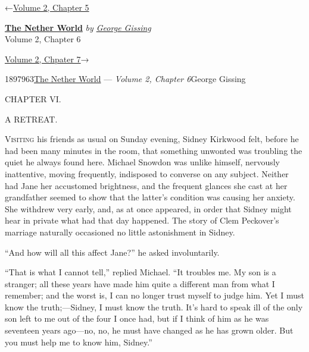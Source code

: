 \hypertarget{headerContainer}{}
\hypertarget{navigationHeader}{}
\protect\hypertarget{headerprevious}{}{←\href{/wiki/The_Nether_World/Volume_2/Chapter_5}{Volume
2, Chapter 5}}

\textbf{\protect\hypertarget{header_title_text}{}{\href{/wiki/The_Nether_World}{The
Nether World}}} \emph{by
\href{/wiki/Author:George_Gissing}{\protect\hypertarget{header_author_text}{}{{George
Gissing}}}}\\
\protect\hypertarget{header_section_text}{}{Volume 2, Chapter 6}

\protect\hypertarget{headernext}{}{\href{/wiki/The_Nether_World/Volume_2/Chapter_7}{Volume
2, Chpater 7}→}

\hypertarget{navigationNotes}{}

\hypertarget{ws-data}{}
\protect\hypertarget{ws-article-id}{}{1897963}\protect\hypertarget{ws-title}{}{\href{/wiki/The_Nether_World}{The
Nether World} --- \emph{Volume 2, Chapter
6}}\protect\hypertarget{ws-author}{}{George Gissing}

{\protect\hypertarget{98}{}{}}

{CHAPTER VI.}

A RETREAT.

\textsc{Visiting} his friends as usual on Sunday evening, Sidney
Kirkwood felt, before he had been many minutes in the room, that
something unwonted was troubling the quiet he always found here. Michael
Snowdon was unlike himself, nervously inattentive, moving frequently,
indisposed to converse on any subject. Neither had Jane her accustomed
brightness, and the frequent glances she cast at her grandfather seemed
to show that the latter's condition was causing her anxiety. She
withdrew very early, and, as at once appeared, in order that Sidney
might hear in private what had that day happened. The story of Clem
Peckover's marriage naturally occasioned no little astonishment in
Sidney.

{\protect\hypertarget{99}{}{}}``And how will all this affect Jane?'' he
asked involuntarily.

``That is what I cannot tell,'' replied Michael. ``It troubles me. My
son is a stranger; all these years have made him quite a different man
from what I remember; and the worst is, I can no longer trust myself to
judge him. Yet I must know the truth;---Sidney, I must know the truth.
It's hard to speak ill of the only son left to me out of the four I once
had, but if I think of him as he was seventeen years ago---no, no, he
must have changed as he has grown older. But you must help me to know
him, Sidney.''

